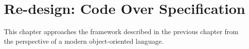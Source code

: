 \documentclass[twoside,openright]{uva-bachelor-thesis}
\newcommand{\code}[1]{\texttt{\footnotesize#1}}
\begin{document}

	
	
	
\chapter{Re-design: Code Over Specification}
	This chapter approaches the framework described in the previous chapter from the perspective of a modern object-oriented language.
\end{document}
